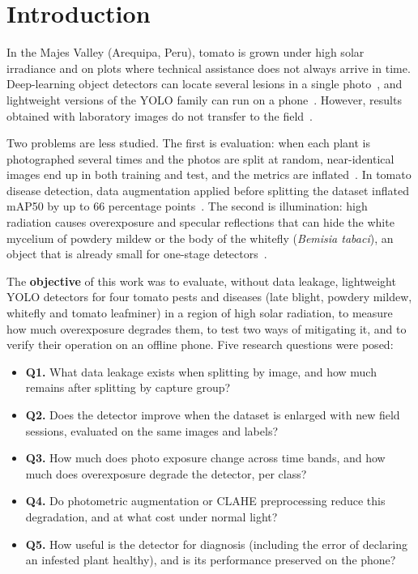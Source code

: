 \documentclass[sensors,article,submit,pdftex,moreauthors]{Definitions/mdpi}
\begin{document}
\section{Introduction}

{\color{blue} In the Majes Valley (Arequipa, Peru), tomato is grown under high solar irradiance and on plots where technical assistance does not always arrive in time.} {\color{blue} Deep-learning object detectors can locate several lesions in a single photo~\cite{Fuentes2017}, and lightweight versions of the YOLO family can run on a phone~\cite{Zhong2024,Wang2025}.} {\color{blue} However, results obtained with laboratory images do not transfer to the field~\cite{Mohanty2016,Jelali2024}.}

{\color{blue} Two problems are less studied.} {\color{blue} The first is evaluation: when each plant is photographed several times and the photos are split at random, near-identical images end up in both training and test, and the metrics are inflated~\cite{Kapoor2023}.} {\color{blue} In tomato disease detection, data augmentation applied before splitting the dataset inflated mAP50 by up to 66 percentage points~\cite{Gerz2025}.} {\color{blue} The second is illumination: high radiation causes overexposure and specular reflections that can hide the white mycelium of powdery mildew or the body of the whitefly (\emph{Bemisia tabaci}), an object that is already small for one-stage detectors~\cite{Zhang2024Jute,Zhao2025}.}

{\color{blue} The \textbf{objective} of this work was to evaluate, without data leakage, lightweight YOLO detectors for four tomato pests and diseases (late blight, powdery mildew, whitefly and tomato leafminer) in a region of high solar radiation, to measure how much overexposure degrades them, to test two ways of mitigating it, and to verify their operation on an offline phone.} {\color{blue} Five research questions were posed:}
{\color{blue}
\begin{itemize}[leftmargin=*,labelsep=4.9mm]
\item \textbf{Q1.} What data leakage exists when splitting by image, and how much remains after splitting by capture group?
\item \textbf{Q2.} Does the detector improve when the dataset is enlarged with new field sessions, evaluated on the same images and labels?
\item \textbf{Q3.} How much does photo exposure change across time bands, and how much does overexposure degrade the detector, per class?
\item \textbf{Q4.} Do photometric augmentation or CLAHE preprocessing reduce this degradation, and at what cost under normal light?
\item \textbf{Q5.} How useful is the detector for diagnosis (including the error of declaring an infested plant healthy), and is its performance preserved on the phone?
\end{itemize}
}
\end{document}
